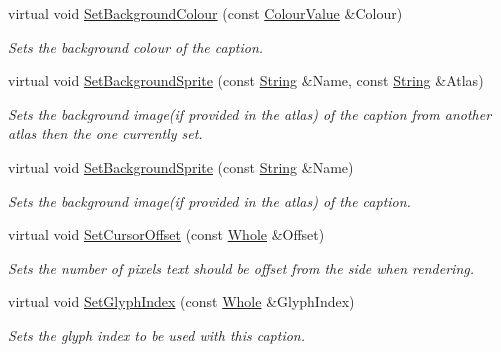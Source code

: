 \begin{DoxyCompactItemize}
virtual void \hyperlink{classMezzanine_1_1UI_1_1Caption_a31f8a3357f03f34bdd48bfcc51f705f5}{SetBackgroundColour} (const \hyperlink{classMezzanine_1_1ColourValue}{ColourValue} \&Colour)
\begin{DoxyCompactList}\small\item\em Sets the background colour of the caption. \item\end{DoxyCompactList}\item 
virtual void \hyperlink{classMezzanine_1_1UI_1_1Caption_a53cc8bf9234184c8f8b99b6640813b59}{SetBackgroundSprite} (const \hyperlink{namespaceMezzanine_acf9fcc130e6ebf08e3d8491aebcf1c86}{String} \&Name, const \hyperlink{namespaceMezzanine_acf9fcc130e6ebf08e3d8491aebcf1c86}{String} \&Atlas)
\begin{DoxyCompactList}\small\item\em Sets the background image(if provided in the atlas) of the caption from another atlas then the one currently set. \item\end{DoxyCompactList}\item 
virtual void \hyperlink{classMezzanine_1_1UI_1_1Caption_a202400000fdf731d0b10712dfd814ee0}{SetBackgroundSprite} (const \hyperlink{namespaceMezzanine_acf9fcc130e6ebf08e3d8491aebcf1c86}{String} \&Name)
\begin{DoxyCompactList}\small\item\em Sets the background image(if provided in the atlas) of the caption. \item\end{DoxyCompactList}\item 
virtual void \hyperlink{classMezzanine_1_1UI_1_1Caption_a93607a41a5d18e2a529c5893b6aae921}{SetCursorOffset} (const \hyperlink{namespaceMezzanine_adcbb6ce6d1eb4379d109e51171e2e493}{Whole} \&Offset)
\begin{DoxyCompactList}\small\item\em Sets the number of pixels text should be offset from the side when rendering. \item\end{DoxyCompactList}\item 
virtual void \hyperlink{classMezzanine_1_1UI_1_1Caption_a2cc9da9ae1e10cd5829117f0d473186a}{SetGlyphIndex} (const \hyperlink{namespaceMezzanine_adcbb6ce6d1eb4379d109e51171e2e493}{Whole} \&GlyphIndex)
\begin{DoxyCompactList}\small\item\em Sets the glyph index to be used with this caption. \item\end{DoxyCompactList}\item 

\end{DoxyCompactItemize}
